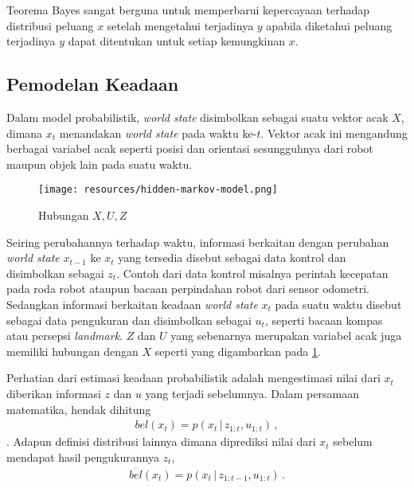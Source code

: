 Teorema Bayes sangat berguna untuk memperbarui kepercayaan terhadap distribusi peluang $x$ setelah mengetahui terjadinya $y$ apabila diketahui peluang terjadinya $y$ dapat ditentukan untuk setiap kemungkinan $x$.

\subsection{Pemodelan Keadaan}

Dalam model probabilistik, \textit{world state} disimbolkan sebagai suatu vektor acak $X$, dimana $x_t$ menandakan \textit{world state} pada waktu ke-$t$. Vektor acak ini mengandung berbagai variabel acak seperti posisi dan orientasi sesungguhnya dari robot maupun objek lain pada suatu waktu.

\begin{figure}[h]
    \centering
    \medskip
    \texttt{[image: resources/hidden-markov-model.png]}
    \caption{Hubungan $X, U, Z$ \citep{thrun2010}}
    \label{fig:hidden-markov-model}
    \bigskip
\end{figure}

Seiring perubahannya terhadap waktu, informasi berkaitan dengan perubahan \textit{world state} $x_{t-1}$ ke $x_t$ yang tersedia disebut sebagai data kontrol dan disimbolkan sebagai $z_t$. Contoh dari data kontrol misalnya perintah kecepatan pada roda robot ataupun bacaan perpindahan robot dari sensor odometri. Sedangkan informasi berkaitan keadaan \textit{world state} $x_t$ pada suatu waktu disebut sebagai data pengukuran dan disimbolkan sebagai $u_t$, seperti bacaan kompas atau persepsi \textit{landmark}. $Z$ dan $U$ yang sebenarnya merupakan variabel acak juga memiliki hubungan dengan $X$ seperti yang digambarkan pada \ref{fig:hidden-markov-model}.

Perhatian dari estimasi keadaan probabilistik adalah mengestimasi nilai dari $x_t$ diberikan informasi $z$ dan $u$ yang terjadi sebelumnya. Dalam persamaan matematika, hendak dihitung
\begin{align}
    bel(x_t) = p(x_t \,|\, z_{1:t}, u_{1:t}) \,,
\end{align}
. Adapun definisi distribusi lainnya dimana diprediksi nilai dari $x_t$ sebelum mendapat hasil pengukurannya $z_t$,
\begin{align}
    \overline{bel}(x_t) = p(x_t \,|\, z_{1:t-1}, u_{1:t}) \,.
\end{align}

